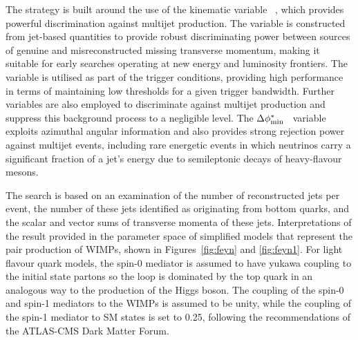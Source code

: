 The strategy is built around the use of the kinematic variable
\alphat~\cite{Randall:2008rw, RA1Paper}, which provides powerful
discrimination against multijet production. The \alphat variable is
constructed from jet-based quantities to provide robust discriminating
power between sources of genuine and misreconstructed missing
transverse momentum, making it suitable for early searches operating
at new energy and luminosity frontiers. The \alphat variable is
utilised as part of the trigger conditions, providing high performance
in terms of maintaining low thresholds for a given trigger
bandwidth. Further variables are also employed to discriminate against
multijet production and suppress this background process to a
negligible level. The $\Delta\phi^{*}_{\rm min}$~\cite{RA1Paper}
variable exploits azimuthal angular information and also provides
strong rejection power against multijet events, including rare
energetic events in which neutrinos carry a significant fraction of a
jet's energy due to semileptonic decays of heavy-flavour mesons.


The search is based on an examination of the number of reconstructed
jets per event, the number of these jets identified as originating
from bottom quarks, and the scalar and vector sums of transverse
momenta of these jets. 
Interpretations of the result %
 provided in the parameter space of simplified
models that represent the
pair production of WIMPs, shown in Figures~\ref{fig:feyn} and \ref{fig:feyn1}.
For light flavour quark models, the spin-0 mediator is assumed to have yukawa coupling to the initial state partons so the loop is dominated by the top quark in an analogous way to the production of the Higgs boson. The coupling of the spin-0 and spin-1 mediators to the WIMPs is assumed to be unity, while the coupling of the spin-1 mediator to SM states is set to 0.25, following the recommendations of the ATLAS-CMS Dark Matter Forum. 

